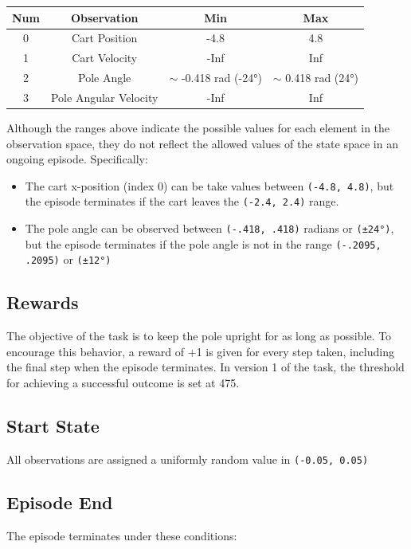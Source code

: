 \documentclass{article} %
\begin{document}
\begin{center}
    \begin{tabular}{cccc}
        \toprule
        Num & Observation & Min & Max \\
        \midrule
        0 & Cart Position & -4.8 & 4.8 \\
        1 & Cart Velocity & -Inf & Inf \\
        2 & Pole Angle & $\sim$ -0.418 rad (-24°) & $\sim$ 0.418 rad (24°) \\
        3 & Pole Angular Velocity & -Inf & Inf \\
        \bottomrule
    \end{tabular}
\end{center}

Although the ranges above indicate the possible values for each element in the observation
space, they do not reflect the allowed values of the state space in an ongoing episode.
Specifically:

\begin{itemize}
    \item The cart x-position (index 0) can be take values between \verb|(-4.8, 4.8)|,
    but the episode terminates if the cart leaves the \verb|(-2.4, 2.4)| range.
    \item The pole angle can be observed between \verb|(-.418, .418)| radians
    or \verb|(±24°)|, but the
    episode terminates if the pole angle is not in the range \verb|(-.2095, .2095)|
    or \verb|(±12°)|
\end{itemize}

\subsection{Rewards}

The objective of the task is to keep the pole upright for as long as possible. To encourage
this behavior, a reward of +1 is given for every step taken, including the final step when
the episode terminates. In version 1 of the task, the threshold for achieving a successful
outcome is set at 475.

\subsection{Start State}
All observations are assigned a uniformly random value in \verb|(-0.05, 0.05)|

\subsection{Episode End}
The episode terminates under these conditions:
\end{document}
